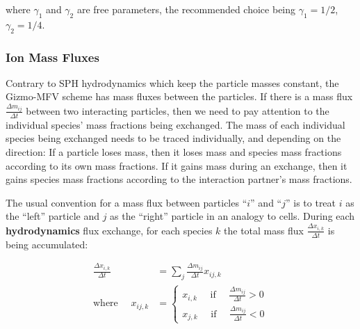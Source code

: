 where $\gamma_1$ and $\gamma_2$ are free parameters, the recommended choice being $\gamma_1 =
1/2$, $\gamma_2 = 1/4$.

%
%
%
%
%
%
%





\subsubsection{Ion Mass Fluxes}


Contrary to SPH hydrodynamics which keep the particle masses constant, the
Gizmo-MFV scheme has mass fluxes between the particles. If there is a mass flux $\frac{\Delta m_{ij}}{\Delta t}$ between two interacting particles, then we need to pay attention to the individual species' mass fractions being exchanged.
The mass of each individual species being exchanged needs to be traced individually, and depending on the direction: If a particle loses mass, then it loses mass and species mass fractions according to its own mass fractions. If it gains mass during an exchange, then it gains species mass fractions according to the interaction partner's mass fractions.

The usual convention for a mass flux between particles ``$i$'' and ``$j$'' is to treat $i$ as the ``left'' particle and $j$ as the ``right'' particle in an analogy to cells. During each \textbf{hydrodynamics} flux exchange, for each species $k$ the total mass flux $\frac{\Delta x_{i,k}}{\Delta t}$ is being accumulated:

\begin{align}
\frac{\Delta x_{i,k}}{\Delta t} &= \sum_j \frac{\Delta m_{ij}}{\Delta t} x_{ij,k}\\
\text{where }\quad x_{ij,k} &=
	\begin{cases}
		x_{i,k} \quad \text{ if } \quad \frac{\Delta m_{ij}}{\Delta t} > 0 \\
		x_{j,k} \quad \text{ if } \quad \frac{\Delta m_{ij}}{\Delta t} < 0
	\end{cases}
\end{align}


